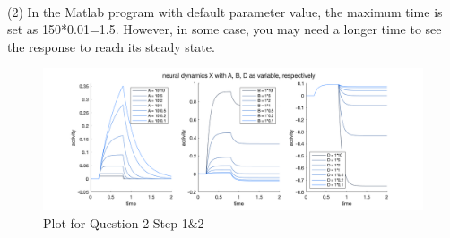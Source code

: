 \documentclass[12pt,letterpaper]{article}
\theoremstyle{definition}
\begin{document}
\\
(2) In the Matlab program with default parameter value, the maximum time is set as 150*0.01=1.5. However, in some case, you may need a longer time to see the response to reach its steady state.


\begin{figure}[h!]
    \centering
    \includegraphics[scale=0.30]{picture/q2-1.png}
    \caption{Plot for Question-2 Step-1&2}
    \label{fig:my_label4}
\end{figure}
\end{document}
